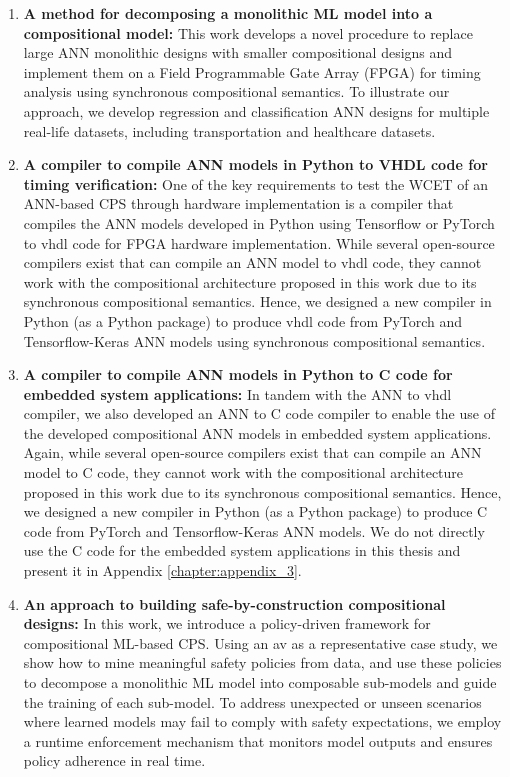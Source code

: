 \begin{enumerate}
 \item \textbf{A method for decomposing a monolithic ML model into a compositional model:} This work develops a novel procedure to replace large ANN monolithic designs with smaller compositional designs and implement them on a Field Programmable Gate Array (FPGA) for timing analysis using synchronous compositional semantics. To illustrate our approach, we develop regression and classification ANN designs for multiple real-life datasets, including transportation and healthcare datasets.

 \item \textbf{A compiler to compile ANN models in Python to VHDL code for timing verification:} One of the key requirements to test the WCET of an ANN-based CPS through hardware implementation is a compiler that compiles the ANN models developed in Python using Tensorflow or PyTorch to \gls{vhdl} code for FPGA hardware implementation. While several open-source compilers exist that can compile an ANN model to \gls{vhdl} code, they cannot work with the compositional architecture proposed in this work due to its synchronous compositional semantics. Hence, we designed a new compiler in Python (as a Python package) to produce \gls{vhdl} code from PyTorch and Tensorflow-Keras ANN models using synchronous compositional semantics.

 \item \textbf{A compiler to compile ANN models in Python to C code for embedded system applications:} In tandem with the ANN to \gls{vhdl} compiler, we also developed an ANN to C code compiler to enable the use of the developed compositional ANN models in embedded system applications. Again, while several open-source compilers exist that can compile an ANN model to C code, they cannot work with the compositional architecture proposed in this work due to its synchronous compositional semantics. Hence, we designed a new compiler in Python (as a Python package) to produce C code from PyTorch and Tensorflow-Keras ANN models. We do not directly use the C code for the embedded system applications in this thesis and present it in Appendix \ref{chapter:appendix_3}.

 \item \textbf{An approach to building safe-by-construction compositional designs:} In this work, we introduce a policy-driven framework for compositional ML-based CPS. Using an  \gls{av} as a representative case study, we show how to mine meaningful safety policies from data, and use these policies to decompose a monolithic ML model into composable sub-models and guide the training of each sub-model. To address unexpected or unseen scenarios where learned models may fail to comply with safety expectations, we employ a runtime enforcement mechanism that monitors model outputs and ensures policy adherence in real time. 


\end{enumerate}

